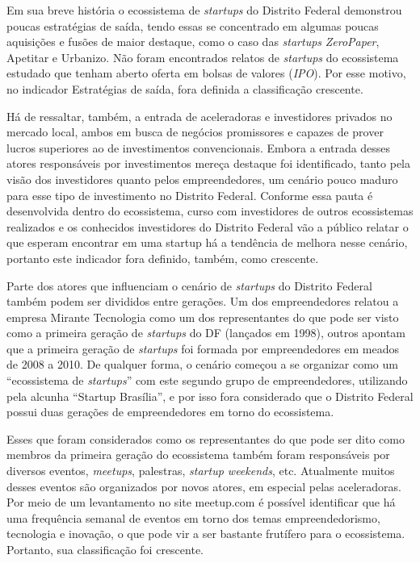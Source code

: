 Em sua breve história o ecossistema de \textit{startups} do Distrito Federal demonstrou poucas estratégias de saída, tendo essas se concentrado em algumas poucas aquisições e fusões de maior destaque, como o caso das \textit{startups} \textit{ZeroPaper}, Apetitar e Urbanizo. Não foram encontrados relatos de \textit{startups} do ecossistema estudado que tenham aberto oferta em bolsas de valores (\textit{IPO}). Por esse motivo, no indicador Estratégias de saída, fora definida a classificação crescente. 

Há de ressaltar, também, a entrada de aceleradoras e investidores privados no mercado local, ambos em busca de negócios promissores e capazes de prover lucros superiores ao de investimentos convencionais. Embora a entrada desses atores responsáveis por investimentos mereça destaque foi identificado, tanto pela visão dos investidores quanto pelos empreendedores, um cenário pouco maduro para esse tipo de investimento no Distrito Federal. Conforme essa pauta é desenvolvida dentro do ecossistema, curso com investidores de outros ecossistemas realizados e os conhecidos investidores do Distrito Federal vão a público relatar o que esperam encontrar em uma startup há a tendência de melhora nesse cenário, portanto este indicador fora definido, também, como crescente.

Parte dos atores que influenciam o cenário de \textit{startups} do Distrito Federal também podem ser divididos entre gerações. Um dos empreendedores relatou a empresa Mirante Tecnologia como um dos representantes do que pode ser visto como a primeira geração de \textit{startups} do DF (lançados em 1998), outros apontam que a primeira geração de \textit{startups} foi formada por empreendedores em meados de 2008 a 2010. De qualquer forma, o cenário começou a se organizar como um ``ecossistema de \textit{startups}'' com este segundo grupo de empreendedores, utilizando pela alcunha ``Startup Brasília'', e por isso fora considerado que o Distrito Federal possui duas gerações de empreendedores em torno do ecossistema.

Esses que foram considerados como os representantes do que pode ser dito como membros da primeira geração do ecossistema também foram responsáveis por diversos eventos, \textit{meetups}, palestras, \textit{startup weekends}, etc. Atualmente muitos desses eventos são organizados por novos atores, em especial pelas aceleradoras. Por meio de um levantamento no site meetup.com é possível identificar que há uma frequência semanal de eventos em torno dos temas empreendedorismo, tecnologia e inovação, o que pode vir a ser bastante frutífero para o ecossistema. Portanto, sua classificação foi crescente.

